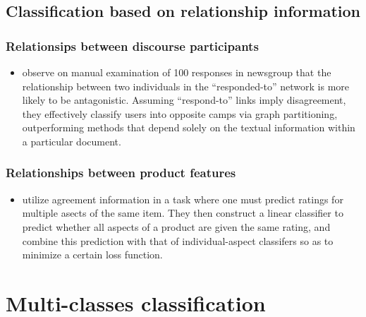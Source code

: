 \documentclass{article}
\begin{document}
    \subsection{Classification based  on relationship information}
      \subsubsection{Relationsips between discourse participants}
        \begin{itemize}
          \item \cite{Agrawal2003} observe on manual examination of 100
responses in newsgroup that the relationship between two individuals in the
``responded-to'' network is more likely to be antagonistic. Assuming
``respond-to'' links imply disagreement, they effectively classify users into
opposite camps via graph partitioning, outperforming methods that depend solely
on the textual information within a particular document.
        \end{itemize}

      \subsubsection{Relationships between product features}
        \begin{itemize}
          \item \cite{Snyder2007} utilize agreement information in a task where
one must predict ratings for multiple asects of the same item. They then
construct a linear classifier to predict whether all aspects of a product are
given the same rating, and combine this prediction with that of
individual-aspect classifers so as to minimize a certain loss function.
\cite{Snyder2007}
        \end{itemize}


  \section{Multi-classes classification}
\end{document}
